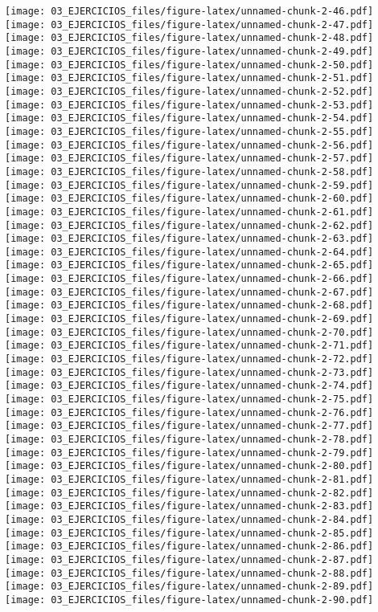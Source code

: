 \documentclass[
]{book}
\begin{document}
\texttt{[image: 03\_EJERCICIOS\_files/figure-latex/unnamed-chunk-2-46.pdf]} \texttt{[image: 03\_EJERCICIOS\_files/figure-latex/unnamed-chunk-2-47.pdf]} \texttt{[image: 03\_EJERCICIOS\_files/figure-latex/unnamed-chunk-2-48.pdf]} \texttt{[image: 03\_EJERCICIOS\_files/figure-latex/unnamed-chunk-2-49.pdf]} \texttt{[image: 03\_EJERCICIOS\_files/figure-latex/unnamed-chunk-2-50.pdf]} \texttt{[image: 03\_EJERCICIOS\_files/figure-latex/unnamed-chunk-2-51.pdf]} \texttt{[image: 03\_EJERCICIOS\_files/figure-latex/unnamed-chunk-2-52.pdf]} \texttt{[image: 03\_EJERCICIOS\_files/figure-latex/unnamed-chunk-2-53.pdf]} \texttt{[image: 03\_EJERCICIOS\_files/figure-latex/unnamed-chunk-2-54.pdf]} \texttt{[image: 03\_EJERCICIOS\_files/figure-latex/unnamed-chunk-2-55.pdf]} \texttt{[image: 03\_EJERCICIOS\_files/figure-latex/unnamed-chunk-2-56.pdf]} \texttt{[image: 03\_EJERCICIOS\_files/figure-latex/unnamed-chunk-2-57.pdf]} \texttt{[image: 03\_EJERCICIOS\_files/figure-latex/unnamed-chunk-2-58.pdf]} \texttt{[image: 03\_EJERCICIOS\_files/figure-latex/unnamed-chunk-2-59.pdf]} \texttt{[image: 03\_EJERCICIOS\_files/figure-latex/unnamed-chunk-2-60.pdf]} \texttt{[image: 03\_EJERCICIOS\_files/figure-latex/unnamed-chunk-2-61.pdf]} \texttt{[image: 03\_EJERCICIOS\_files/figure-latex/unnamed-chunk-2-62.pdf]} \texttt{[image: 03\_EJERCICIOS\_files/figure-latex/unnamed-chunk-2-63.pdf]} \texttt{[image: 03\_EJERCICIOS\_files/figure-latex/unnamed-chunk-2-64.pdf]} \texttt{[image: 03\_EJERCICIOS\_files/figure-latex/unnamed-chunk-2-65.pdf]} \texttt{[image: 03\_EJERCICIOS\_files/figure-latex/unnamed-chunk-2-66.pdf]} \texttt{[image: 03\_EJERCICIOS\_files/figure-latex/unnamed-chunk-2-67.pdf]} \texttt{[image: 03\_EJERCICIOS\_files/figure-latex/unnamed-chunk-2-68.pdf]} \texttt{[image: 03\_EJERCICIOS\_files/figure-latex/unnamed-chunk-2-69.pdf]} \texttt{[image: 03\_EJERCICIOS\_files/figure-latex/unnamed-chunk-2-70.pdf]} \texttt{[image: 03\_EJERCICIOS\_files/figure-latex/unnamed-chunk-2-71.pdf]} \texttt{[image: 03\_EJERCICIOS\_files/figure-latex/unnamed-chunk-2-72.pdf]} \texttt{[image: 03\_EJERCICIOS\_files/figure-latex/unnamed-chunk-2-73.pdf]} \texttt{[image: 03\_EJERCICIOS\_files/figure-latex/unnamed-chunk-2-74.pdf]} \texttt{[image: 03\_EJERCICIOS\_files/figure-latex/unnamed-chunk-2-75.pdf]} \texttt{[image: 03\_EJERCICIOS\_files/figure-latex/unnamed-chunk-2-76.pdf]} \texttt{[image: 03\_EJERCICIOS\_files/figure-latex/unnamed-chunk-2-77.pdf]} \texttt{[image: 03\_EJERCICIOS\_files/figure-latex/unnamed-chunk-2-78.pdf]} \texttt{[image: 03\_EJERCICIOS\_files/figure-latex/unnamed-chunk-2-79.pdf]} \texttt{[image: 03\_EJERCICIOS\_files/figure-latex/unnamed-chunk-2-80.pdf]} \texttt{[image: 03\_EJERCICIOS\_files/figure-latex/unnamed-chunk-2-81.pdf]} \texttt{[image: 03\_EJERCICIOS\_files/figure-latex/unnamed-chunk-2-82.pdf]} \texttt{[image: 03\_EJERCICIOS\_files/figure-latex/unnamed-chunk-2-83.pdf]} \texttt{[image: 03\_EJERCICIOS\_files/figure-latex/unnamed-chunk-2-84.pdf]} \texttt{[image: 03\_EJERCICIOS\_files/figure-latex/unnamed-chunk-2-85.pdf]} \texttt{[image: 03\_EJERCICIOS\_files/figure-latex/unnamed-chunk-2-86.pdf]} \texttt{[image: 03\_EJERCICIOS\_files/figure-latex/unnamed-chunk-2-87.pdf]} \texttt{[image: 03\_EJERCICIOS\_files/figure-latex/unnamed-chunk-2-88.pdf]} \texttt{[image: 03\_EJERCICIOS\_files/figure-latex/unnamed-chunk-2-89.pdf]} \texttt{[image: 03\_EJERCICIOS\_files/figure-latex/unnamed-chunk-2-90.pdf]} 
\end{document}
